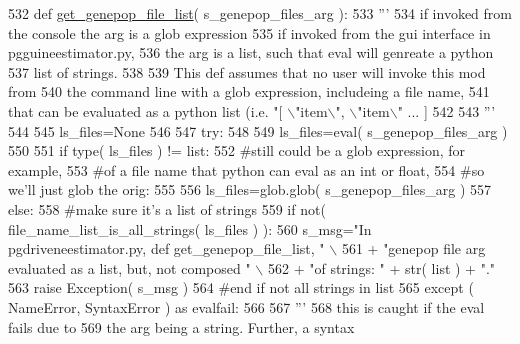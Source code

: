 \begin{DoxyCode}
532 \textcolor{keyword}{def }\hyperlink{namespacenegui_1_1pgdriveneestimator_a15b09d2967ec4812353b0e146f074799}{get\_genepop\_file\_list}( s\_genepop\_files\_arg ):
533     \textcolor{stringliteral}{'''}
534 \textcolor{stringliteral}{    if invoked from the console the arg is a glob expression}
535 \textcolor{stringliteral}{    if invoked from the gui interface in pgguineestimator.py,}
536 \textcolor{stringliteral}{    the arg is a list, such that eval will genreate a python}
537 \textcolor{stringliteral}{    list of strings.}
538 \textcolor{stringliteral}{}
539 \textcolor{stringliteral}{    This def assumes that no user will invoke this mod from }
540 \textcolor{stringliteral}{    the command line with a glob expression, includeing a file name,}
541 \textcolor{stringliteral}{    that can be evaluated as a python list (i.e. "[ \(\backslash\)"item\(\backslash\)", \(\backslash\)"item\(\backslash\)" ... ]}
542 \textcolor{stringliteral}{    }
543 \textcolor{stringliteral}{    '''}
544 
545     ls\_files=\textcolor{keywordtype}{None}
546 
547     \textcolor{keywordflow}{try}:
548 
549         ls\_files=eval( s\_genepop\_files\_arg )
550 
551         \textcolor{keywordflow}{if} type( ls\_files ) != list:
552             \textcolor{comment}{#still could be a glob expression, for example,}
553             \textcolor{comment}{#of a file name that python can eval as an int or float,}
554             \textcolor{comment}{#so we'll just glob the orig:}
555 
556             ls\_files=glob.glob( s\_genepop\_files\_arg )
557         \textcolor{keywordflow}{else}:
558             \textcolor{comment}{#make sure it's a list of strings}
559             \textcolor{keywordflow}{if} not( file\_name\_list\_is\_all\_strings( ls\_files ) ):
560                 s\_msg=\textcolor{stringliteral}{"In pgdriveneestimator.py, def get\_genepop\_file\_list, "} \(\backslash\)
561                         + \textcolor{stringliteral}{"genepop file arg evaluated as a list, but, not composed "} \(\backslash\)
562                         + \textcolor{stringliteral}{"of strings: "} + str( list ) + \textcolor{stringliteral}{"."}
563                 \textcolor{keywordflow}{raise} Exception( s\_msg )
564             \textcolor{comment}{#end if not all strings in list}
565     \textcolor{keywordflow}{except} ( NameError, SyntaxError ) \textcolor{keyword}{as} evalfail:
566 
567         \textcolor{stringliteral}{'''}
568 \textcolor{stringliteral}{        this is caught if the eval fails due to }
569 \textcolor{stringliteral}{        the arg being a string.  Further, a syntax}

\end{DoxyCode}
